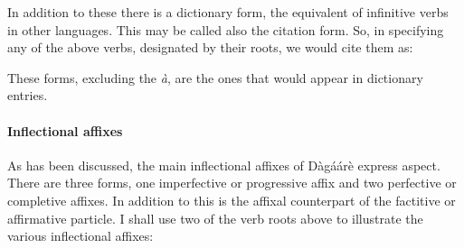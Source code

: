 

In addition to these there is a dictionary form, the equivalent of infinitive verbs in other
languages. This may be called also the citation form. So, in specifying any of the above
verbs, designated by their roots, we would cite them as:



These forms, excluding the \textit{à}, are the ones that would appear in dictionary entries.

\paragraph{Inflectional affixes}
As has been discussed, the main inflectional affixes of Dàgáárè express aspect.
There are three forms, one imperfective or progressive affix and two perfective or completive
affixes. In addition to this is the affixal counterpart of the factitive or affirmative particle. I
shall use two of the verb roots above to illustrate the various inflectional affixes:


